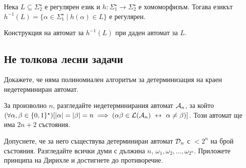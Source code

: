 \begin{problem}
  Нека $L\subseteq \Sigma^\star_2$ е регулярен език и $h:\Sigma^\star_1\to\Sigma^\star_2$ е хомоморфизъм.
  Тогава езикът
  $h^{-1}(L) = \{\alpha \in \Sigma^\star_1 \mid h(\alpha) \in L\}$ е регулярен.  
\end{problem}
\begin{hint}
  Конструкция на автомат за $h^{-1}(L)$ при даден автомат за $L$.
\end{hint}

\subsection{Не толкова лесни задачи}

\begin{problem}
  Докажете, че няма полиномиален алгоритъм за детерминизация на краен недетерминиран автомат.
\end{problem}
\begin{hint}
  За произволно $n$, разгледайте недетерминирания автомат $\mathcal{A}_n$, за който
  $(\forall \alpha,\beta \in \{0,1\}^\star)[|\alpha| = |\beta| = n \implies (\alpha\beta \in \mathcal{L}(\mathcal{A}_n) \ \leftrightarrow\  \alpha \neq \beta)]$.
  Този автомат ще има $2n+2$ състояния.

  Допуснете, че за него съществува детерминиран автомат $\mathcal{D}_n$ с $< 2^n$ на брой състояния.
  Разгледайте всички думи с дължина $n$, $\omega_1,\omega_2,\dots,\omega_{2^n}$.
  Приложете принципа на Дирихле и достигнете до противоречие.
\end{hint}


